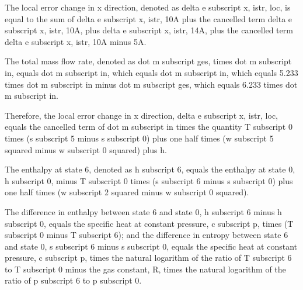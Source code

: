 The local error change in x direction, denoted as delta e subscript x, istr, loc, is equal to the sum of delta e subscript x, istr, 10A plus the cancelled term delta e subscript x, istr, 10A, plus delta e subscript x, istr, 14A, plus the cancelled term delta e subscript x, istr, 10A minus 5A.

The total mass flow rate, denoted as dot m subscript ges, times dot m subscript in, equals dot m subscript in, which equals dot m subscript in, which equals 5.233 times dot m subscript in minus dot m subscript ges, which equals 6.233 times dot m subscript in.

Therefore, the local error change in x direction, delta e subscript x, istr, loc, equals the cancelled term of dot m subscript in times the quantity T subscript 0 times (s subscript 5 minus s subscript 0) plus one half times (w subscript 5 squared minus w subscript 0 squared) plus h.

The enthalpy at state 6, denoted as h subscript 6, equals the enthalpy at state 0, h subscript 0, minus T subscript 0 times (s subscript 6 minus s subscript 0) plus one half times (w subscript 2 squared minus w subscript 0 squared).

The difference in enthalpy between state 6 and state 0, h subscript 6 minus h subscript 0, equals the specific heat at constant pressure, c subscript p, times (T subscript 0 minus T subscript 6); and the difference in entropy between state 6 and state 0, s subscript 6 minus s subscript 0, equals the specific heat at constant pressure, c subscript p, times the natural logarithm of the ratio of T subscript 6 to T subscript 0 minus the gas constant, R, times the natural logarithm of the ratio of p subscript 6 to p subscript 0.